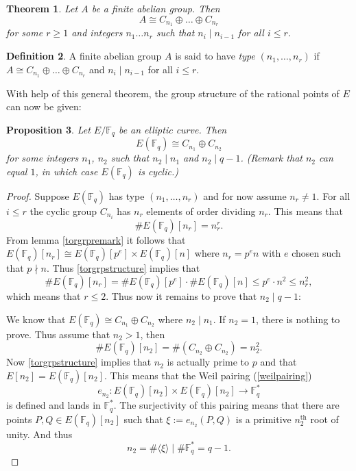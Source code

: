 \documentclass{article}
\numberwithin{equation}{section}
\newtheorem{theorem}{Theorem}[subsection]
\newtheorem{proposition}[theorem]{Proposition}
\theoremstyle{definition}
\newtheorem{definition}[theorem]{Definition}
\newcommand{\FF}[1]{{\mathbb F}_{#1}} %
\newcommand{\grgen}[1]{\langle #1 \rangle} %
\begin{document}
\begin{theorem}\label{fingrpstructure}
Let $A$ be a finite abelian group. Then $$A \cong C_{n_1}\oplus \ldots \oplus C_{n_r}$$ for some $r \geq 1$ and integers $n_1\ldots n_r$ such that $n_i \mid n_{i-1}$ for all $i \leq r$.  
\end{theorem}


\begin{definition}
A finite abelian group $A$ is said to have \emph{type} $(n_1,\ldots,n_r)$ if $A \cong C_{n_1}\oplus \ldots \oplus C_{n_r}$ and $n_i \mid n_{i-1}$ for all $i \leq r$.
\end{definition}

With help of this general theorem, the group structure of the rational points of $E$ can now be given:

\begin{proposition}\label{finiteECstruc}
Let $E/\FF{q}$ be an elliptic curve. Then $$E(\FF{q}) \cong C_{n_1}\oplus C_{n_2}$$ for some integers $n_1$, $n_2$ such that $n_2 \mid n_1$ and $n_2 \mid q-1$. (Remark that $n_2$ can equal $1$, in which case $E(\FF{q})$ is cyclic.)
\end{proposition}

\begin{proof}
Suppose $E(\FF{q})$ has type $(n_1,\ldots,n_r)$ and for now assume $n_r\neq1$. For all $i \leq r$ the cyclic group $C_{n_i}$ has $n_r$ elements of order dividing $n_r$.  This means that $$\#E(\FF{q})[n_r]=n_r^r.$$ From lemma \ref{torgrpremark} it follows that $E(\FF{q})[n_r]\cong E(\FF{q})[p^e] \times E(\FF{q})[n]$ where $n_r=p^en$ with $e$ chosen such that $p\nmid n$. Thus \ref{torgrpstructure} implies that $$\#E(\FF{q})[n_r] = \#E(\FF{q})[p^e] \cdot \#E(\FF{q})[n] \leq p^e \cdot n^2 \leq n_r^2,$$ which means that $r \leq 2$. Thus now it remains to prove that $n_2 \mid q-1$:\par
We know that $E(\FF{q}) \cong C_{n_1} \oplus C_{n_2}$ where $n_2 \mid n_1$. If $n_2=1$, there is nothing to prove. Thus assume that $n_2 > 1$, then $$\#E(\FF{q})[n_2] = \#(C_{n_2} \oplus C_{n_2}) =n_2^2.$$ Now \ref{torgrpstructure} implies that $n_2$ is actually prime to $p$ and that $E[n_2] = E(\FF{q})[n_2]$. This means that the Weil pairing (\ref{weilpairing}) $$e_{n_2}: E(\FF{q})[n_2] \times E(\FF{q})[n_2] \rightarrow \FF{q}^*$$ is defined and lands in $\FF{q}^*$. The surjectivity of this pairing means that there are points $P,Q \in E(\FF{q})[n_2]$ such that $\xi := e_{n_2}(P,Q)$  is a primitive $n_2^\text{th}$ root of unity. And thus $$n_2=\# \grgen{\xi} \mid \# \FF{q}^*=q-1.$$
\end{proof}
\end{document}
